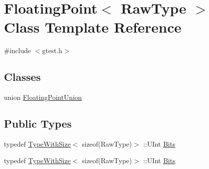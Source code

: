 \hypertarget{classtesting_1_1internal_1_1FloatingPoint}{\section{\-Floating\-Point$<$ \-Raw\-Type $>$ \-Class \-Template \-Reference}
\label{dd/d0f/classtesting_1_1internal_1_1FloatingPoint}
}


{\ttfamily \#include $<$gtest.\-h$>$}

\subsection*{\-Classes}
\begin{DoxyCompactItemize}
\item 
union \hyperlink{uniontesting_1_1internal_1_1FloatingPoint_1_1FloatingPointUnion}{\-Floating\-Point\-Union}
\end{DoxyCompactItemize}
\subsection*{\-Public \-Types}
\begin{DoxyCompactItemize}
\item 
typedef \hyperlink{classtesting_1_1internal_1_1TypeWithSize}{\-Type\-With\-Size}$<$ sizeof(\-Raw\-Type)$>$\*
\-::\-U\-Int \hyperlink{classtesting_1_1internal_1_1FloatingPoint_adb12c064e30491d4976393880f9dca27}{\-Bits}
\item 
typedef \hyperlink{classtesting_1_1internal_1_1TypeWithSize}{\-Type\-With\-Size}$<$ sizeof(\-Raw\-Type)$>$\*
\-::\-U\-Int \hyperlink{classtesting_1_1internal_1_1FloatingPoint_adb12c064e30491d4976393880f9dca27}{\-Bits}
\end{DoxyCompactItemize}
